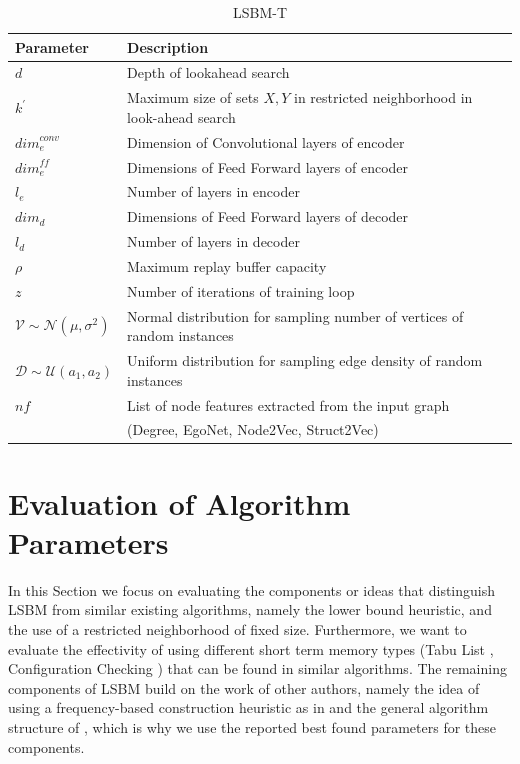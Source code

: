 \documentclass[draft,final]{vutinfth} %
\begin{document}
\begin{table}
    \centering
    \begin{tabular}{ll}
        \hline
        Parameter & Description \\ \hline
        $d$ & Depth of lookahead search \\
        $k^\prime$ & Maximum size of sets $X,Y$ in restricted neighborhood in look-ahead search \\
        $\mathit{dim}^{\mathit{conv}}_e$ & Dimension of Convolutional layers of encoder \\
        $\mathit{dim}^{\mathit{ff}}_e$ & Dimensions of Feed Forward layers of encoder \\
        $l_e$ & Number of layers in encoder \\
        $\mathit{dim}_d$ & Dimensions of Feed Forward layers of decoder \\
        $l_d$ & Number of layers in decoder \\
        $\rho$ & Maximum replay buffer capacity \\
        $z$ & Number of iterations of training loop \\
        $\mathcal{V} \sim \mathcal{N}(\mu, \sigma^2)$ & Normal distribution for sampling number of vertices of random instances \\
        $\mathcal{D} \sim \mathcal{U}(a_1, a_2) $ & Uniform distribution for sampling edge density of random instances \\
        $\mathit{nf}$ & List of node features extracted from the input graph  \\
        & (Degree, EgoNet, Node2Vec, Struct2Vec)
    \end{tabular}
    \caption{LSBM-T}
    \label{tab:parameters-lsbm-t}
\end{table}

\section{Evaluation of Algorithm Parameters}\label{sec:alg-params}
In this Section we focus on evaluating the components or ideas that distinguish LSBM from similar existing algorithms, namely the lower bound heuristic, and the use of a restricted neighborhood of fixed size. Furthermore, we want to evaluate the effectivity of using different short term memory types (Tabu List \cite{djeddi_extension_2019}\cite{zhou_opposition-based_2020}, Configuration Checking \cite{chen_nuqclq_2021}) that can be found in similar algorithms. The remaining components of LSBM build on the work of other authors, namely the idea of using a frequency-based construction heuristic as in \cite{chen_nuqclq_2021} and the general algorithm structure of \cite{djeddi_extension_2019}, which is why we use the reported best found parameters for these components. 
\end{document}
